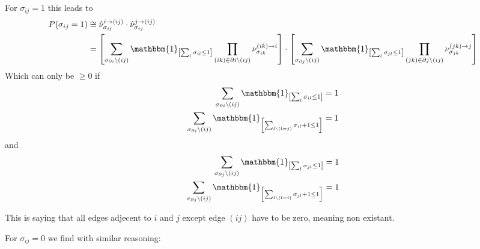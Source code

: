 \documentclass[a4paper]{scrartcl}
\begin{document}
For $\sigma_{ij} = 1$ this leads to 
\begin{align}
    P(\sigma_{ij} = 1) &\cong \hat{\nu}_{\sigma_{ij}}^{i \rightarrow (ij)} \cdot \hat{\nu}_{\sigma_{ij}}^{j \rightarrow (ij)} \\
    &= \left[ \sum_{\sigma_{\partial i} \backslash (ij)} \mathbbm{1}_{\left[\sum_l \sigma_{il} \leq 1 \right]} \prod_{(ik) \in \partial i \backslash (ij)} \nu_{\sigma_{ik}}^{(ik) \rightarrow i} \right]
     \cdot \left[ \sum_{\sigma_{\partial j} \backslash (ij)} \mathbbm{1}_{\left[\sum_l \sigma_{jl} \leq 1 \right]} \prod_{(jk) \in \partial j \backslash (ij)} \nu_{\sigma_{jk}}^{(jk) \rightarrow j} \right]
\end{align}
Which can only be $\geq 0$ if 
\begin{align}
    \sum_{\sigma_{\partial i} \backslash (ij)} \mathbbm{1}_{\left[\sum_l \sigma_{il} \leq 1 \right]} &= 1 \\
    \sum_{\sigma_{\partial i} \backslash (ij)} \mathbbm{1}_{\left[\sum_{l \backslash (l = j)} \sigma_{il} + 1 \leq 1 \right]} &= 1 \\
\end{align}
and 
\begin{align}
    \sum_{\sigma_{\partial j} \backslash (ij)} \mathbbm{1}_{\left[\sum_l \sigma_{jl} \leq 1 \right]} &= 1 \\
    \sum_{\sigma_{\partial j} \backslash (ij)} \mathbbm{1}_{\left[\sum_{l \backslash (l = i)} \sigma_{jl} + 1 \leq 1 \right]} &= 1
\end{align}

This is saying that all edges adjecent to $i$ and $j$ except edge $(ij)$ have to be zero, meaning non existant. 


For $\sigma_{ij} = 0$ we find with similar reasoning:
\end{document}
